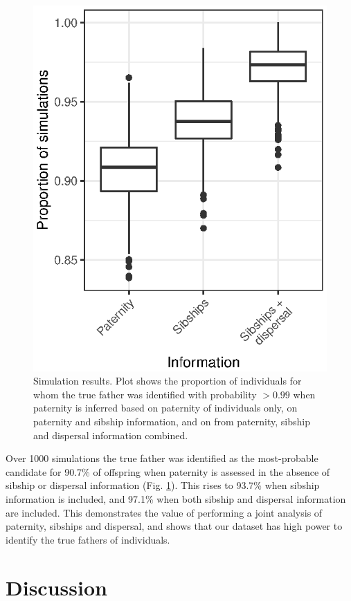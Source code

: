\documentclass[10pt, a4paper, twocolumn]{article} %
\begin{document}
\begin{figure}
    \includegraphics{simulations.eps}
    \caption{Simulation results. Plot shows the proportion of individuals for whom the true father was identified with probability $>0.99$ when paternity is inferred based on paternity of individuals only, on paternity and sibship information, and on from paternity, sibship and dispersal information combined.}
    \label{fig:simulations}
\end{figure}

Over 1000 simulations the true father was identified as the most-probable candidate for 90.7\% of offspring when paternity is assessed in the absence of sibship or dispersal information (Fig. \ref{fig:simulations}). This rises to 93.7\% when sibship information is included, and 97.1\% when both sibship and dispersal information are included. This demonstrates the value of performing a joint analysis of paternity, sibships and dispersal, and shows that our dataset has high power to identify the true fathers of individuals.

\section{Discussion}
\end{document}
